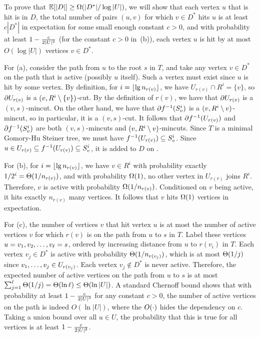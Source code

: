 To prove that $\mathbb E[|D|] \ge \Omega(|D^*|/\log|U|)$, we will show that
 \BE
 \im[(a)] each vertex $u$ that is hit is in $D$, 
 \im[(b)] the total number of pairs $(u,v)$ for which $v\in D^*$ hits $u$ is at least $c |D^*|$ in expectation for some small enough constant $c>0$, and
 \im[(c)] with probability at least $1-\frac c{2|U|^2}$ (for the constant $c>0$ in~(b)), each vertex $u$ is hit by at most $O(\log|U|)$ vertices $v\in D^*$. %
 \EE

For (a), consider the path from $u$ to the root $s$ in $T$, and take any vertex $v\in D^*$ on the path that is active (possibly $u$ itself). Such a vertex must exist since $u$ is hit by some vertex. By definition, for $i=\lfloor\lg n_{r(v)}\rfloor$, we have $U_{r(v)}\cap R^i=\{v\}$, so $\partial U_{r(v)}$ is a $(v,R^i\setminus \{v\})$-cut.  By the definition of $r(v)$, we have that $\partial U_{r(v)}$ is a $(v,s)$-mincut. On the other hand, we have that $\partial f^{-1}(S^i_v)$ is a $(v,R^i\setminus v)$-mincut, so in particular, it is a $(v,s)$-cut. It follows that $\partial f^{-1}(U_{r(v)})$ and $\partial f^{-1}(S^i_v)$ are both $(v,s)$-mincuts and $(v,R^i\setminus v)$-mincuts. Since $T$ is a minimal Gomory-Hu Steiner tree, we must have $f^{-1}(U_{r(v)}) \subseteq S^i_v$. Since $u\in U_{r(v)}\subseteq f^{-1}(U_{r(v)})\subseteq S^i_v$, it is added to $D$ on . 

For (b), for $i=\lfloor\lg n_{r(v)}\rfloor$, we have $v\in R^i$ with probability exactly $1/2^i = \Theta(1/n_{r(v)})$, and with probability $\Omega(1)$, no other vertex in $U_{r(v)}$ joins $R^i$. Therefore, $v$ is active with probability $\Omega(1/n_{r(v)})$. Conditioned on $v$ being active, it hits exactly $n_{r(v)}$ many vertices. It follows that $v$ hits $\Omega(1)$ vertices in expectation.

For (c), the number of vertices $v$ that hit vertex $u$ is at most the number of active vertices $v$ for which $r(v)$ is on the path from $u$ to $s$ in $T$. Label these vertices $u=v_1,v_2,\ldots,v_\ell=s$, ordered by increasing distance from $u$ to $r(v_i)$ in $T$. Each vertex $v_j\in D^*$ is active with probability $\Theta(1/n_{r(v_j)})$, which is at most $\Theta(1/j)$ since $v_1,\ldots,v_j \in U_{r(v_j)}$. Each vertex $v_j\notin D^*$ is never active. Therefore, the expected number of active vertices on the path from $u$ to $s$ is at most $\sum_{j=1}^\ell\Theta(1/j)=\Theta(\ln\ell)\le \Theta(\ln|U|)$. A standard Chernoff bound shows that with probability at least $1-\frac c{2|U|^3}$ for any constant $c>0$, the number of active vertices on the path is indeed $O(\ln|U|)$, where the $O(\cdot)$ hides the dependency on $c$. Taking a union bound over all $u\in U$, the probability that this is true for all vertices is at least $1-\frac c{2|U|^2}$.

